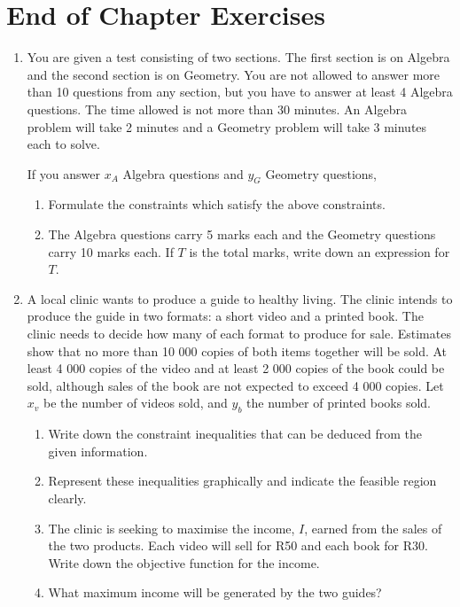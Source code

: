 \section{End of Chapter Exercises}
\begin{enumerate}

\item{You are given a test consisting of two sections. The first section is on Algebra and the second section is on Geometry. You are not allowed to answer more than 10 questions from any section, but you have to answer at least 4 Algebra questions. The time allowed is not more than 30 minutes. An Algebra problem will take 2 minutes and a Geometry problem will take 3 minutes each to solve.

If you answer $x_A$ Algebra questions and $y_G$ Geometry questions,
\begin{enumerate}
\item{Formulate the constraints which satisfy the above constraints.}
\item{The Algebra questions carry 5 marks each and the Geometry questions carry 10 marks each. If $T$ is the total marks, write down an expression for $T$.}
\end{enumerate}}

\item{A local clinic wants to produce a guide to healthy living. The clinic intends to produce the guide in two formats: a short video and a printed book. The clinic needs to decide how many of each format to produce for sale. Estimates show that no more than 10 000 copies of both items together will be sold. At least 4 000 copies of the video and at least 2 000 copies of the book could be sold, although sales of the book are not expected to exceed 4 000 copies. Let $x_v$ be the number of videos sold, and $y_b$ the number of printed books sold.
\begin{enumerate}
\item{Write down the constraint inequalities that can be deduced from the given information.}
\item{Represent these inequalities graphically and indicate the feasible region clearly.}
\item{The clinic is seeking to maximise the income, $I$, earned from the sales of the two products. Each video will sell for R50 and each book for R30. Write down the objective function for the income.}
\item{What maximum income will be generated by the two guides?}
\end{enumerate}}


\end{enumerate}
